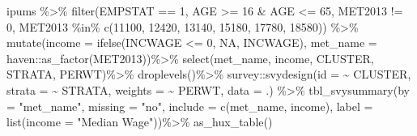 \documentclass[
]{article}
\newenvironment{Shaded}{\begin{snugshade}}{\end{snugshade}}
\newcommand{\AttributeTok}[1]{\textcolor[rgb]{0.77,0.63,0.00}{#1}}
\newcommand{\ConstantTok}[1]{\textcolor[rgb]{0.00,0.00,0.00}{#1}}
\newcommand{\DecValTok}[1]{\textcolor[rgb]{0.00,0.00,0.81}{#1}}
\newcommand{\FunctionTok}[1]{\textcolor[rgb]{0.00,0.00,0.00}{#1}}
\newcommand{\NormalTok}[1]{#1}
\newcommand{\SpecialCharTok}[1]{\textcolor[rgb]{0.00,0.00,0.00}{#1}}
\newcommand{\StringTok}[1]{\textcolor[rgb]{0.31,0.60,0.02}{#1}}
\begin{document}
\begin{Shaded}
\begin{Highlighting}[]
\NormalTok{ipums }\SpecialCharTok{\%\textgreater{}\%}
 \FunctionTok{filter}\NormalTok{(EMPSTAT }\SpecialCharTok{==} \DecValTok{1}\NormalTok{,}
\NormalTok{         AGE }\SpecialCharTok{\textgreater{}=} \DecValTok{16} \SpecialCharTok{\&}\NormalTok{ AGE }\SpecialCharTok{\textless{}=} \DecValTok{65}\NormalTok{, }
\NormalTok{         MET2013 }\SpecialCharTok{!=} \DecValTok{0}\NormalTok{, }
\NormalTok{         MET2013 }\SpecialCharTok{\%in\%} \FunctionTok{c}\NormalTok{(}\DecValTok{11100}\NormalTok{, }\DecValTok{12420}\NormalTok{, }\DecValTok{13140}\NormalTok{, }\DecValTok{15180}\NormalTok{, }\DecValTok{17780}\NormalTok{, }\DecValTok{18580}\NormalTok{)) }\SpecialCharTok{\%\textgreater{}\%} 
  \FunctionTok{mutate}\NormalTok{(}\AttributeTok{income =} \FunctionTok{ifelse}\NormalTok{(INCWAGE }\SpecialCharTok{\textless{}=} \DecValTok{0}\NormalTok{, }\ConstantTok{NA}\NormalTok{, INCWAGE),}
         \AttributeTok{met\_name =}\NormalTok{ haven}\SpecialCharTok{::}\FunctionTok{as\_factor}\NormalTok{(MET2013))}\SpecialCharTok{\%\textgreater{}\%}
  \FunctionTok{select}\NormalTok{(met\_name,  income, CLUSTER, STRATA, PERWT)}\SpecialCharTok{\%\textgreater{}\%}
  \FunctionTok{droplevels}\NormalTok{()}\SpecialCharTok{\%\textgreater{}\%}
\NormalTok{  survey}\SpecialCharTok{::}\FunctionTok{svydesign}\NormalTok{(}\AttributeTok{id =} \SpecialCharTok{\textasciitilde{}}\NormalTok{ CLUSTER,}
                   \AttributeTok{strata =} \SpecialCharTok{\textasciitilde{}}\NormalTok{ STRATA,}
                   \AttributeTok{weights =} \SpecialCharTok{\textasciitilde{}}\NormalTok{ PERWT,}
                \AttributeTok{data =}\NormalTok{ .) }\SpecialCharTok{\%\textgreater{}\%}
   \FunctionTok{tbl\_svysummary}\NormalTok{(}\AttributeTok{by =} \StringTok{"met\_name"}\NormalTok{,}
                  \AttributeTok{missing =} \StringTok{"no"}\NormalTok{,}
                  \AttributeTok{include =} \FunctionTok{c}\NormalTok{(met\_name, income), }
                  \AttributeTok{label =} \FunctionTok{list}\NormalTok{(}\AttributeTok{income =} \StringTok{"Median Wage"}\NormalTok{))}\SpecialCharTok{\%\textgreater{}\%}
  \FunctionTok{as\_hux\_table}\NormalTok{()}
\end{Highlighting}
\end{Shaded}

 
  \providecommand{\huxb}[2]{\arrayrulecolor[RGB]{#1}\global\arrayrulewidth=#2pt}
  \providecommand{\huxvb}[2]{\color[RGB]{#1}\vrule width #2pt}
  \providecommand{\huxtpad}[1]{\rule{0pt}{#1}}
  \providecommand{\huxbpad}[1]{\rule[-#1]{0pt}{#1}}
\end{document}
